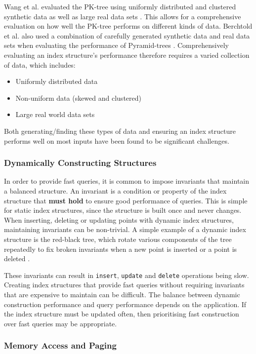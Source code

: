 Wang et al. evaluated the PK-tree using uniformly distributed and clustered synthetic data as well as large real data sets \cite{pk-tree}. This allows for a comprehensive evaluation on how well the PK-tree performs on different kinds of data. Berchtold et al. also used a combination of carefully generated synthetic data and real data sets when evaluating the performance of Pyramid-trees \cite{pyramid-tree}. 
Comprehensively evaluating an index structure's performance therefore requires a varied collection of data, which includes:
\begin{itemize}
	\item Uniformly distributed data
	\item Non-uniform data (skewed and clustered)
	\item Large real world data sets
\end{itemize}	
Both generating/finding these types of data and ensuring an index structure performs well on most inputs have been found to be significant challenges.

\subsubsection{Dynamically Constructing Structures}

In order to provide fast queries, it is common to impose invariants that maintain a balanced structure. An invariant is a condition or property of the index structure that \textbf{must hold} to ensure good performance of queries. This is simple for static index structures, since the structure is built once and never changes. When inserting, deleting or updating points with dynamic index structures, maintaining invariants can be non-trivial. A simple example of a dynamic index structure is the red-black tree, which rotate various components of the tree repeatedly to fix broken invariants when a new point is inserted or a point is deleted \cite{introduction-to-algorithms}.

These invariants can result in \texttt{insert}, \texttt{update} and \texttt{delete} operations being slow. Creating index structures that provide fast queries without requiring invariants that are expensive to maintain can be difficult. The balance between dynamic construction performance and query performance depends on the application. If the index structure must be updated often, then prioritising fast construction over fast queries may be appropriate.

\subsubsection{Memory Access and Paging}
\label{sec:paging}

